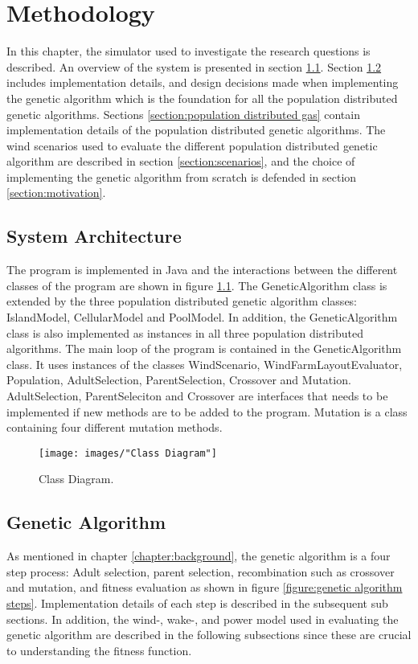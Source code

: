 \chapter{Methodology}\label{chapter:methodology}%
In this chapter, the simulator used to investigate the research questions is described. An overview of the system is presented in section \ref{section:systemt architecture}. Section \ref{section:genetic algorithm} includes implementation details, and design decisions made when implementing the genetic algorithm which is the foundation for all the population distributed genetic algorithms. Sections \ref{section:population distributed gas} contain implementation details of the population distributed genetic algorithms. The wind scenarios used to evaluate the different population distributed genetic algorithm are described in section \ref{section:scenarios}, and the choice of implementing the genetic algorithm from scratch is defended in section \ref{section:motivation}.


\section{System Architecture}\label{section:systemt architecture}
The program is implemented in Java and the interactions between the different classes of the program are shown in figure \ref{figure:class diagram}. The GeneticAlgorithm class is extended by the three population distributed genetic algorithm classes: IslandModel, CellularModel and PoolModel. In addition, the GeneticAlgorithm class is also implemented as instances in all three population distributed algorithms. The main loop of the program is contained in the GeneticAlgorithm class. It uses instances of the classes WindScenario, WindFarmLayoutEvaluator, Population, AdultSelection, ParentSelection, Crossover and Mutation. AdultSelection, ParentSeleciton and Crossover are interfaces that needs to be implemented if new methods are to be added to the program. Mutation is a class containing four different mutation methods. 


\begin{figure}[h!]
\begin{center}
\texttt{[image: images/"Class Diagram"]}
\caption{Class Diagram.}
\label{figure:class diagram}
\end{center}
\end{figure}


\section{Genetic Algorithm}\label{section:genetic algorithm}
As mentioned in chapter \ref{chapter:background}, the genetic algorithm is a four step process: Adult selection, parent selection, recombination such as crossover and mutation, and fitness evaluation as shown in figure \ref{figure:genetic algorithm steps}. Implementation details of each step is described in the subsequent sub sections. In addition, the wind-, wake-, and power model used in evaluating the genetic algorithm are described in the following subsections since these are crucial to understanding the fitness function. 


